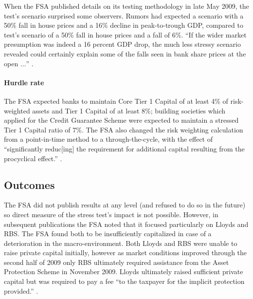 \documentclass[12pt]{article}
\begin{document}
When the FSA published details on its testing methodology in late May 2009, the test's scenario surprised some observers. Rumors had expected a scenario with a 50\% fall in house prices and a 16\% decline in peak-to-trough GDP, compared to test's scenario of a 50\% fall in house prices and a fall of 6\%. ``If the wider market presumption was indeed a 16 percent GDP drop, the much less stressy scenario revealed could certainly explain some of the falls seen in bank share prices at the open $\dots$'' \citep{Stressy}.

\paragraph{Hurdle rate}

The FSA expected banks to maintain Core Tier 1 Capital of at least 4\% of risk-weighted assets and Tier 1 Capital of at least 8\%; building societies which applied for the Credit Guarantee Scheme were expected to maintain a stressed Tier 1 Capital ratio of 7\%. \citep{Results} The FSA also changed the risk weighting calculation from a point-in-time method to a through-the-cycle, with the effect of ``significantly reduc[ing] the requirement for additional capital resulting from the procyclical effect.'' \citep{Jan2009}.

\subsection{Outcomes}

The FSA did not publish results at any level (and refused to do so in the future) so direct measure of the stress test's impact is not possible. However, in subsequent publications the FSA noted that it focused particularly on Lloyds and RBS. The FSA found both to be insufficiently capitalized in case of a deterioration in the macro-environment. Both Lloyds and RBS were unable to raise private capital initially, however as market conditions improved through the second half of 2009 only RBS ultimately required assistance from the Asset Protection Scheme in November 2009. Lloyds ultimately raised sufficient private capital but was required to pay a fee ``to the taxpayer for the implicit protection provided.'' \citep{FSAReport}.
\end{document}
